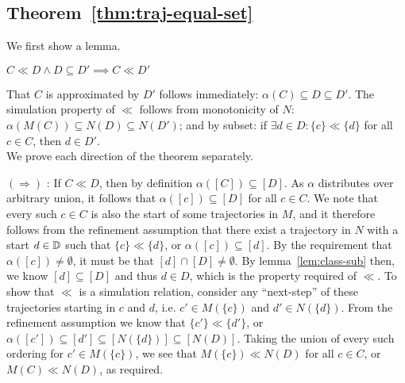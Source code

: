 \subsection{Theorem~\ref{thm:traj-equal-set}}

We first show a lemma.

\begin{lemma} \label{lem:ll-sub}
$C \ll D \wedge D \subseteq D' \implies C \ll D'$
\end{lemma}

That $C$ is approximated by $D'$ follows immediately: $\alpha(C) \subseteq D \subseteq D'$. The simulation property of $\ll$ follows from monotonicity of $N$: $\alpha(M(C)) \subseteq N(D) \subseteq N(D')$; and  by subset: if $\exists d \in D : \{ c \} \ll \{ d \}$ for all $c \in C$, then $d \in D'$. %
\\

We prove each direction of the theorem separately.

$(\Rightarrow)$ : If $C \ll D$, then by definition $\alpha([C]) \subseteq [D]$. As $\alpha$ distributes over arbitrary union, it follows that $\alpha([c]) \subseteq [D]$ for all $c \in C$. We note that every such $c \in C$ is also the start of some trajectories in $M$, and it therefore follows from the refinement assumption that there exist a trajectory in $N$ with a start $d \in \mathbb{D}$ such that $\{ c \} \ll \{ d \}$, or $\alpha([c]) \subseteq [d]$. By the requirement that $\alpha([c]) \neq \emptyset$, it must be that $[d] \cap [D] \neq \emptyset$. By lemma~\ref{lem:class-sub} then, we know $[d] \subseteq [D]$ and thus $d \in D$, which is the  property required of $\ll$. To show that $\ll$ is a simulation relation, consider any ``next-step'' of these trajectories starting in $c$ and $d$, i.e. $c' \in M(\{ c \})$ and $d' \in N(\{ d \})$. From the refinement assumption we know that $\{ c' \} \ll \{ d' \}$, or $\alpha([c']) \subseteq [d'] \subseteq [N(\{ d \})] \subseteq [N(D)]$. Taking the union of every such ordering for $c' \in M(\{ c \})$, we see that $M(\{ c \}) \ll N(D)$ for all $c \in C$, or $M(C) \ll N(D)$, as required.




